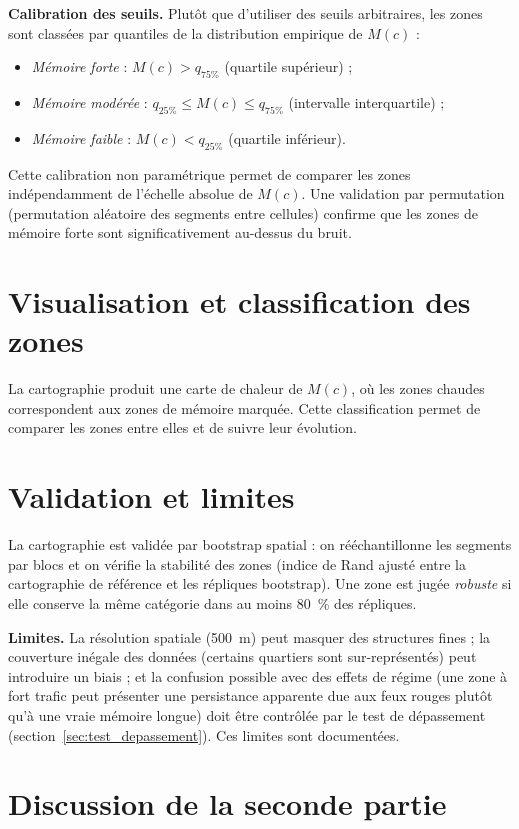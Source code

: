 \medskip
\textbf{Calibration des seuils.} Plutôt que d'utiliser des seuils arbitraires, les zones sont classées par quantiles de la distribution empirique de $M(c)$ :
\begin{itemize}
\item \emph{Mémoire forte} : $M(c) > q_{75\%}$ (quartile supérieur) ;
\item \emph{Mémoire modérée} : $q_{25\%} \le M(c) \le q_{75\%}$ (intervalle interquartile) ;
\item \emph{Mémoire faible} : $M(c) < q_{25\%}$ (quartile inférieur).
\end{itemize}
Cette calibration non paramétrique permet de comparer les zones indépendamment de l'échelle absolue de $M(c)$. Une validation par permutation (permutation aléatoire des segments entre cellules) confirme que les zones de mémoire forte sont significativement au-dessus du bruit.

\section{Visualisation et classification des zones}
La cartographie produit une carte de chaleur de $M(c)$, où les zones chaudes correspondent aux zones de mémoire marquée. Cette classification permet de comparer les zones entre elles et de suivre leur évolution.

\section{Validation et limites}
\label{sec:validation_carto}
La cartographie est validée par bootstrap spatial : on rééchantillonne les segments par blocs et on vérifie la stabilité des zones (indice de Rand ajusté entre la cartographie de référence et les répliques bootstrap). Une zone est jugée \emph{robuste} si elle conserve la même catégorie dans au moins 80~\% des répliques.

\medskip
\textbf{Limites.} La résolution spatiale (500~m) peut masquer des structures fines ; la couverture inégale des données (certains quartiers sont sur-représentés) peut introduire un biais ; et la confusion possible avec des effets de régime (une zone à fort trafic peut présenter une persistance apparente due aux feux rouges plutôt qu'à une vraie mémoire longue) doit être contrôlée par le test de dépassement (section~\ref{sec:test_depassement}). Ces limites sont documentées.

\section{Discussion de la seconde partie}
\label{sec:discussion2}

